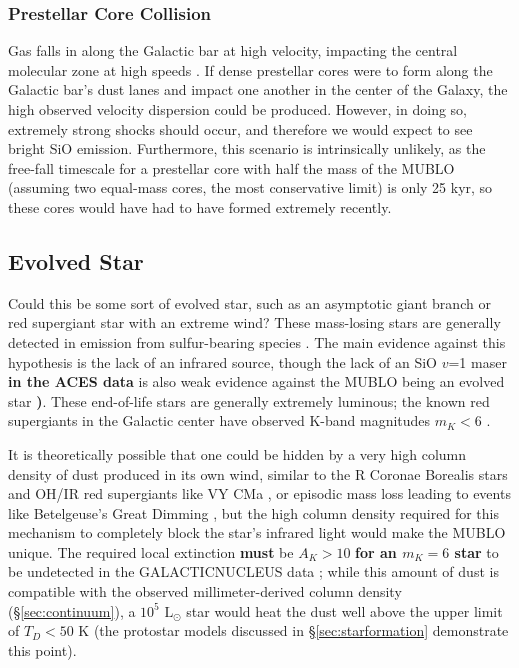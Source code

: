\documentclass[]{aastex631}
\newcommand{\lsun}{\ensuremath{\mathrm{L}_\odot}\xspace}
\def\rr#1{\textbf{#1}}
\begin{document}
\subsubsection{Prestellar Core Collision}
\label{sec:corecollision}

Gas falls in along the Galactic bar at high velocity, impacting the central molecular zone at high speeds \citep{Sormani2019,Gramze2023}.
If dense prestellar cores were to form along the Galactic bar's dust lanes and impact one another in the center of the Galaxy, the high observed velocity dispersion could be produced.
However, in doing so, extremely strong shocks should occur, and therefore we would expect to see bright SiO emission.
Furthermore, this scenario is intrinsically unlikely, as the free-fall timescale for a prestellar core with half the mass of the MUBLO (assuming two equal-mass cores, the most conservative limit) is only 25 kyr, so these cores would have had to have formed extremely recently.


\subsection{Evolved Star}
\label{sec:evolvedstars}
Could this be some sort of evolved star, such as an asymptotic giant branch or red supergiant star with an extreme wind?
These mass-losing stars are generally detected in emission from sulfur-bearing species \citep[e.g.,][]{Omont1993}.
The main evidence against this hypothesis is the lack of an infrared source, though the lack of an SiO $v$=1 maser \rr{in the ACES data} is also weak evidence against the MUBLO being an evolved star \rr{\citep[at least 15\% of red supergiants exhibit SiO masers;][]{Verheyen2012})}.
These end-of-life stars are generally extremely luminous; the known red supergiants in the Galactic center have observed K-band magnitudes $m_K < 6$ \citep{Schultheis2020}.

It is theoretically possible that one could be hidden by a very high column density of dust produced in its own wind, similar to the R Coronae Borealis stars and OH/IR red supergiants like VY CMa \citep{Humphreys2024}, or episodic mass loss leading to events like Betelgeuse's Great Dimming \citep{Montarges2021,Levesque2020}, but the high column density required for this mechanism to completely block the star's infrared light would make the MUBLO unique.
The required local extinction \rr{must} be $A_K>10$ \rr{for an $m_K=6$ star} to be undetected in the GALACTICNUCLEUS data \citep{Nogueras-Lara2019}; while this amount of dust is compatible with the observed millimeter-derived column density (\S \ref{sec:continuum}), a $10^5$ \lsun star would heat the dust well above the upper limit of $T_D<50$ K (the protostar models discussed in \S \ref{sec:starformation} demonstrate this point).
\end{document}
